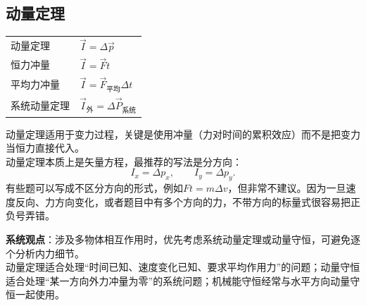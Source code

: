 
\subsection{动量定理}
\begin{tabularx}{\columnwidth}{XX}
  动量定理&$\vec I=\Delta\vec p$\\
  恒力冲量&$\vec I=\vec F t$\\
  平均力冲量&$\vec I=\vec F_{\text{平均}}\Delta t$\\
  系统动量定理&$\vec I_{\text{外}}=\Delta\vec P_{\text{系统}}$\\
\end{tabularx}

\begin{formulanotebox}
动量定理适用于变力过程，关键是使用冲量（力对时间的累积效应）而不是把变力当恒力直接代入。\\
动量定理本质上是矢量方程，最推荐的写法是分方向：
\[
  I_x=\Delta p_x,\qquad I_y=\Delta p_y.
\]
有些题可以写成不区分方向的形式，例如$Ft=m\Delta v$，但非常不建议。因为一旦速度反向、力方向变化，或者题目中有多个方向的力，不带方向的标量式很容易把正负号弄错。
\end{formulanotebox}

\begin{keypointbox}
\textbf{系统观点}：涉及多物体相互作用时，优先考虑系统动量定理或动量守恒，可避免逐个分析内力细节。\\
动量定理适合处理“时间已知、速度变化已知、要求平均作用力”的问题；动量守恒适合处理“某一方向外力冲量为零”的系统问题；机械能守恒经常与水平方向动量守恒一起使用。
\end{keypointbox}

